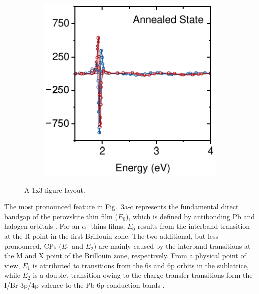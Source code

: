 \begin{figure}[htbp]
\begin{subfigure}{0.31\textwidth}
        \caption{}
        \label{fig:ellipsometry:deriv:300}
    \end{subfigure}
    \hfill
    \begin{subfigure}{0.31\textwidth}
        \includegraphics[width=\textwidth]{chapters/ellipsometry/image/Deriv_Anneal.pdf}
        \caption{}
        \label{fig:ellipsometry:deriv:anneal}
    \end{subfigure}
    \caption{A 1x3 figure layout.}
    \label{fig:ellipsometry:deriv}
\end{figure}


The most pronounced feature in Fig.~\ref{fig:ellipsometry:deriv}a-c represents the fundamental direct bandgap of the perovskite thin film ($E_0$), which is defined by antibonding Pb and halogen orbitals \cite{Mannino2020Temperature-DependentCrystals}. For an $\alpha$- thins films, $E_0$ results from the interband transition at the R point in the first Brillouin zone. The two additional, but less pronounced, CPs ($E_1$ and $E_2$) are mainly caused by the interband transitions at the M and X point of the Brillouin zone, respectively. From a physical point of view, $E_1$ is attributed to transitions from the 6s and 6p orbits in the  sublattice, while $E_2$ is a doublet transition owing to the charge-transfer transitions form the I/Br 3p/4p valence to the Pb 6p conduction bands \cite{Zhao2018EllipsometricFilm}.   


